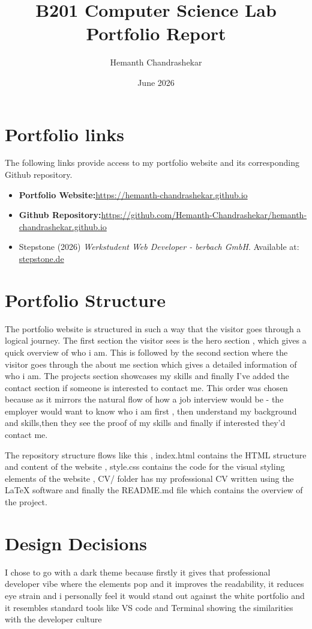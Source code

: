 \documentclass{article}
\title{B201 Computer Science Lab\\Portfolio Report}
\author{Hemanth Chandrashekar}
\date{June 2026}
\begin{document}
\maketitle
\section{Portfolio links}
The following links provide access to my portfolio website and its corresponding Github repository.
\begin{itemize}
    \item \textbf{Portfolio Website:}\href{https://hemanth-chandrashekar.github.io}{https://hemanth-chandrashekar.github.io}
    \item \textbf{Github Repository:}\href {https://github.com/Hemanth-Chandrashekar/hemanth-chandrashekar.github.io}{https://github.com/Hemanth-Chandrashekar/hemanth-chandrashekar.github.io}
    \item Stepstone (2026) \textit{Werkstudent Web Developer - berbach GmbH}. Available at: \href{https://stepstone.de/stellenangebote--WERKSTUDENT-WEB-DEVELOPER-M-W-D-Berlin-Kreuzberg-berbach-GmbH-Gestaltung-und-Beratung--12732537-inline.html}{stepstone.de}
\end{itemize}
\section{Portfolio Structure}
The portfolio website is structured  in such a way that the visitor goes through a logical journey. The first section the visitor sees is the hero section , which gives a quick overview of who i am. This is followed by the second section where the visitor goes through the about me section which gives a detailed information of who i am. The projects section showcases my skills and finally I've added the contact section if someone is interested to contact me. This order was chosen because as it mirrors the natural flow of how a job interview would be - the employer would want to know who i am first , then understand my background and skills,then they see the proof of my skills and finally if interested they'd contact me. 

The repository structure flows like this , index.html contains the HTML structure and content of the website , style.css contains the code for the visual styling elements of the website , CV/ folder has my professional CV written using the LaTeX software and finally the README.md file which contains the overview of the project. 
\section{Design Decisions}
I chose to go with a dark theme because firstly it gives that professional developer vibe where the elements pop and it improves the readability, it reduces eye strain and i personally feel it would stand out against the white portfolio and it resembles standard tools like VS code and Terminal showing the similarities with the developer culture 
\end{document}

